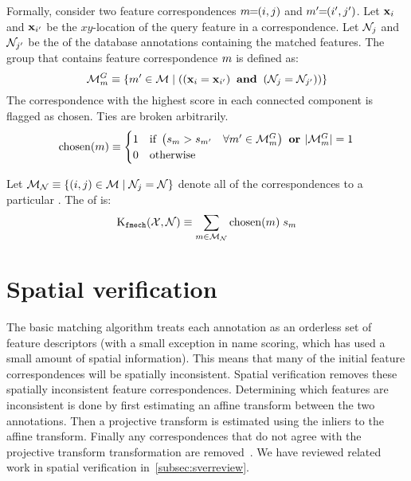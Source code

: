             \newcommand{\MatchesGroup}{\Matches^{G}}

            Formally, consider two feature correspondences $m\mkern-6mu=\mkern-6mu(i, j)$ and $m'\mkern-6mu=\mkern-6mu(i', j')$.
            Let $\mathbf{x}_{i}$ and $\mathbf{x}_{i'}$ be the $xy$-location of the query feature in a correspondence. Let
            $\mathcal{N}_{j}$ and $\mathcal{N}_{j'}$ be the \name{} of the database annotations containing the matched
            features. The group that contains feature correspondence $m$ is defined as:
            \begin{equation}
                \MatchesGroup_{\mI} \eqv \curly{\mII \in \Matches  \where
                \paren{
                    \paren{\pt_{\iI} \eq \pt_{\iII}} \AND 
                    \paren{\nid_{\jI} \eq \nid_{\jII}}
                }
            }
            \end{equation}
            The correspondence with the highest score in each connected component is flagged as chosen. Ties are
            broken arbitrarily.
            \begin{equation}
                \ischosen(\mI) \eqv 
                \bincase{
                \paren{
                    \fs_{\mI} > \fs_{\mII} 
                    \quad \forall \mII  \in \MatchesGroup_{\mI}
                } 
                \OR
                \card{\MatchesGroup_{\mI}} \eq 1
                }
            \end{equation}

            Let $\mathcal{M}_{\mathcal{N}} \equiv \{(i, j) \in \mathcal{M} \mid
              \mathcal{N}_j = \mathcal{N}\}$ denote all of the correspondences to a particular
              \name{}.
            The \nscore{} of \aan{\name{}} is:
            \begin{equation}
                \operatorname{K_{{\tt{fmech}}}}(\mathcal{X}, \mathcal{N}) 
                \equiv 
                \sum_{m \in \mathcal{M}_{\mathcal{N}}} \operatorname{chosen}(m) \; s_m
            \end{equation}

            \namematch{}


\section{Spatial verification}\label{sec:sver}

    The basic matching algorithm treats each annotation as an orderless set of feature descriptors (with a small
    exception in name scoring, which has used a small amount of spatial information). This means that many of the
    initial feature correspondences will be spatially inconsistent. Spatial verification removes these spatially
    inconsistent feature correspondences. Determining which features are inconsistent is done by first estimating
    an affine transform between the two annotations. Then a projective transform is estimated using the inliers to
    the affine transform. Finally any correspondences that do not agree with the projective transform
    transformation are removed~\cite{fischler_random_1981, philbin_object_2007}. We have reviewed related work in
    spatial verification in~\cref{subsec:sverreview}.

